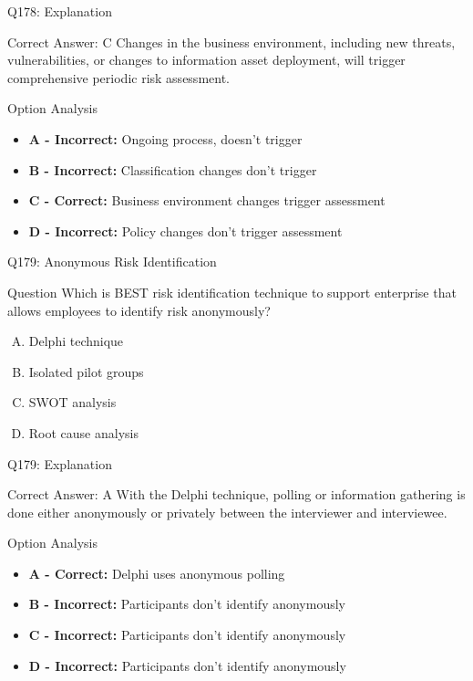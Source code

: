 \documentclass{beamer}
\begin{document}
	\begin{frame}{Q178: Explanation}
		\begin{block}{Correct Answer: C}
			Changes in the business environment, including new threats, vulnerabilities, or changes to information asset deployment, will trigger comprehensive periodic risk assessment.
		\end{block}
		\begin{block}{Option Analysis}
			\begin{itemize}
				\item \textbf{A - Incorrect:} Ongoing process, doesn't trigger
				\item \textbf{B - Incorrect:} Classification changes don't trigger
				\item \textbf{C - Correct:} Business environment changes trigger assessment
				\item \textbf{D - Incorrect:} Policy changes don't trigger assessment
			\end{itemize}
		\end{block}
	\end{frame}
	
	\begin{frame}{Q179: Anonymous Risk Identification}
		\begin{block}{Question}
			Which is BEST risk identification technique to support enterprise that allows employees to identify risk anonymously?
		\end{block}
		\begin{enumerate}[(A)]
			\item Delphi technique
			\item Isolated pilot groups
			\item SWOT analysis
			\item Root cause analysis
		\end{enumerate}
	\end{frame}
	
	\begin{frame}{Q179: Explanation}
		\begin{block}{Correct Answer: A}
			With the Delphi technique, polling or information gathering is done either anonymously or privately between the interviewer and interviewee.
		\end{block}
		\begin{block}{Option Analysis}
			\begin{itemize}
				\item \textbf{A - Correct:} Delphi uses anonymous polling
				\item \textbf{B - Incorrect:} Participants don't identify anonymously
				\item \textbf{C - Incorrect:} Participants don't identify anonymously
				\item \textbf{D - Incorrect:} Participants don't identify anonymously
			\end{itemize}
		\end{block}
	\end{frame}
	
\end{document}
